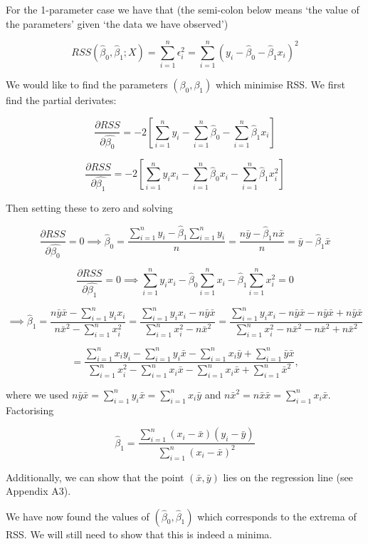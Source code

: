\documentclass[11pt]{article}
\begin{document}
For the 1-parameter case we have that (the semi-colon below means `the
value of the parameters' given `the data we have observed')

\[RSS(\hat{\beta}_0,\hat{\beta}_1;X) = \sum_{i=1}^n \epsilon_i^2 = \sum_{i=1}^n (y_i-\hat{\beta}_0 - \hat{\beta}_1 x_i)^2\]

We would like to find the parameters \((\beta_0,\beta_1)\) which
minimise RSS. We first find the partial derivates:

\[\frac{\partial RSS}{\partial \hat{\beta_0}} = -2 [ \sum_{i=1}^n y_i - \sum_{i=1}^n \hat{\beta}_0 - \sum_{i=1}^n \hat{\beta}_1 x_i]\]

\[\frac{\partial RSS}{\partial \hat{\beta_1}} = -2 [ \sum_{i=1}^n y_i x_i - \sum_{i=1}^n \hat{\beta}_0 x_i - \sum_{i=1}^n \hat{\beta}_1 x_i^2]\]

Then setting these to zero and solving

\[\frac{\partial RSS}{\partial \hat{\beta_0}} = 0 \implies  \hat{\beta}_0 = \frac{\sum_{i=1}^n y_i - \hat{\beta}_1 \sum_{i=1}^n y_i}{n} = \frac{n \bar{y} - \hat{\beta}_1 n \bar{x}}{n} = \bar{y} - \hat{\beta}_1 \bar{x}\]

\[\frac{\partial RSS}{\partial \hat{\beta_1}} = 0 \implies  \sum_{i=1}^n y_i x_i - \hat{\beta}_0 \sum_{i=1}^n x_i - \hat{\beta}_1 \sum_{i=1}^n x_i^2 = 0\]

\[\implies \hat{\beta}_1 = \frac{n \bar{y} \bar{x} - \sum_{i=1}^n y_i x_i}{n \bar{x}^2 - \sum_{i=1}^n x_i^2} = \frac{\sum_{i=1}^n y_i x_i - n \bar{y} \bar{x}}{\sum_{i=1}^n x_i^2 - n \bar{x}^2} = \frac{\sum_{i=1}^n y_i x_i - n \bar{y} \bar{x} - n \bar{y} \bar{x} + n\bar{y} \bar{x}}{\sum_{i=1}^n x_i^2 - n \bar{x}^2 -n\bar{x}^2 + n\bar{x}^2}\]

\[= \frac{\sum_{i=1}^n x_i y_i - \sum_{i=1}^n y_i \bar{x} - \sum_{i=1}^n x_i \bar{y}  + \sum_{i=1}^n \bar{y} \bar{x}}{\sum_{i=1}^n x_i^2 - \sum_{i=1}^n x_i \bar{x} - \sum_{i=1}^n x_i \bar{x} + \sum_{i=1}^n \bar{x}^2},\]

where we used
\(n\bar{y} \bar{x} = \sum_{i=1}^n y_i \bar{x} = \sum_{i=1}^n x_i \bar{y}\)
and \(n\bar{x}^2 = n\bar{x} \bar{x} = \sum_{i=1}^n x_i \bar{x}\).
Factorising

\[\hat{\beta}_1 = \frac{\sum_{i=1}^n (x_i - \bar{x})(y_i - \bar{y})}{\sum_{i=1}^n (x_i - \bar{x})^2}\]

Additionally, we can show that the point \((\bar{x},\bar{y})\) lies on
the regression line (see Appendix A3).

We have now found the values of \((\hat{\beta}_0,\hat{\beta}_1)\) which
corresponds to the extrema of RSS. We will still need to show that this
is indeed a minima.
\end{document}
